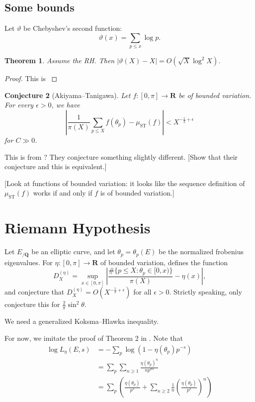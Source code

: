 \documentclass{article}
\DeclareMathOperator{\ST}{ST}
\newcommand{\bQ}{\mathbf{Q}}
\newcommand{\bR}{\mathbf{R}}
\newtheorem{theorem}{Theorem}
\newtheorem{conjecture}[theorem]{Conjecture}
\numberwithin{theorem}{section}
\begin{document}
\subsection{Some bounds}

Let $\vartheta$ be Chebyshev's second function:
\[
	\vartheta(x) = \sum_{p\leqslant x} \log p .
\]

\begin{theorem}
Assume the RH. Then $|\vartheta(X)-X| = O(\sqrt X\log^2 X)$. 
\end{theorem}
\begin{proof}
This is \cite[Th.~10]{schoenfeld1976}
\end{proof}

\begin{conjecture}[Akiyama--Tanigawa]
Let $f\colon [0,\pi]\to \bR$ be of bounded variation. For every $\epsilon>0$, 
we have 
\[
	\left|\frac{1}{\pi(X)} \sum_{p\leqslant X} f(\theta_p) - \mu_{\mathrm{ST}}(f)\right| < X^{-\frac 1 2 + \epsilon}
\]
for $C\gg 0$. 
\end{conjecture}

This is from \cite{akiyama-tanigawa}? They conjecture something slightly 
different. [Show that their conjecture and this is equivalent.]

[Look at functions of bounded variation: it looks like the sequence 
definition of $\mu_{\ST}(f)$ works if and only if $f$ is of bounded 
variation.]





\section{Riemann Hypothesis}

Let $E_{/\bQ}$ be an elliptic curve, and let $\theta_p=\theta_p(E)$ be the 
normalized frobenius eigenvalues. For $\eta\colon [0,\pi]\to \bR$ of bounded 
variation, \cite{akiyama-tanigawa} defines the function 
\[
	D_X^{(\eta)} = \sup_{x\in [0,\pi]} \left|\frac{\#\{p\leqslant X : \theta_p\in [0,x)\}}{\pi(X)} - \eta(x)\right| ,
\]
and conjecture that $D_X^{(\eta)} = O(X^{-\frac 1 2+\epsilon})$ for all 
$\epsilon>0$. Strictly speaking, \cite{akiyama-tanigawa} only conjecture this 
for $\frac{2}{\pi}\sin^2\theta$. 

We need a generalized Koksma--Hlawka inequality.

For now, we imitate the proof of Theorem 2 in \cite{akiyama-tanigawa}. Note 
that 
\begin{align*}
	\log L_\eta(E,s) &= -\sum_p \log(1-\eta(\theta_p)p^{-s}) \\
		&= \sum_p \sum_{n\geqslant 1} \frac{\eta(\theta_p)^n}{n p^{n s}} \\
		&= \sum_p\left(\frac{\eta(\theta_p)}{p^s} + \sum_{n\geqslant 2} \frac{1}{n} \left(\frac{\eta(\theta_p)}{p^s}\right)^n\right)
\end{align*}
\end{document}
